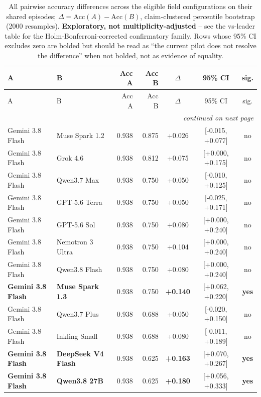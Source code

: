 \begin{longtable}{llrrccc}
\caption{All pairwise accuracy differences across the \FieldSize{} eligible field configurations on their \CommonEpisodes{} shared episodes; $\Delta = \mathrm{Acc}(A) - \mathrm{Acc}(B)$, claim-clustered percentile bootstrap (2000 resamples). \textbf{Exploratory, not multiplicity-adjusted} -- see the vs-leader table for the Holm-Bonferroni-corrected confirmatory family. Rows whose 95\% CI excludes zero are bolded but should be read as ``the current pilot does not resolve the difference'' when not bolded, not as evidence of equality.}\label{tab:pairwise-full}\\
\toprule
A & B & Acc A & Acc B & $\Delta$ & 95\% CI & sig. \\
\midrule
\endfirsthead
\toprule
A & B & Acc A & Acc B & $\Delta$ & 95\% CI & sig. \\
\midrule
\endhead
\midrule
\multicolumn{7}{r}{\emph{continued on next page}} \\
\endfoot
\bottomrule
\endlastfoot
Gemini 3.8 Flash & Muse Spark 1.2 & 0.938 & 0.875 & +0.026 & [-0.015, +0.077] & no \\
Gemini 3.8 Flash & Grok 4.6 & 0.938 & 0.812 & +0.075 & [+0.000, +0.175] & no \\
Gemini 3.8 Flash & Qwen3.7 Max & 0.938 & 0.750 & +0.050 & [-0.010, +0.125] & no \\
Gemini 3.8 Flash & GPT-5.6 Terra & 0.938 & 0.750 & +0.050 & [-0.025, +0.171] & no \\
Gemini 3.8 Flash & GPT-5.6 Sol & 0.938 & 0.750 & +0.080 & [+0.000, +0.240] & no \\
Gemini 3.8 Flash & Nemotron 3 Ultra & 0.938 & 0.750 & +0.104 & [+0.000, +0.240] & no \\
Gemini 3.8 Flash & Qwen3.8 Flash & 0.938 & 0.750 & +0.080 & [+0.000, +0.240] & no \\
\textbf{Gemini 3.8 Flash} & \textbf{Muse Spark 1.3} & 0.938 & 0.750 & \textbf{+0.140} & [+0.062, +0.220] & \textbf{yes} \\
Gemini 3.8 Flash & Qwen3.7 Plus & 0.938 & 0.688 & +0.050 & [-0.020, +0.150] & no \\
Gemini 3.8 Flash & Inkling Small & 0.938 & 0.688 & +0.080 & [-0.011, +0.189] & no \\
\textbf{Gemini 3.8 Flash} & \textbf{DeepSeek V4 Flash} & 0.938 & 0.625 & \textbf{+0.163} & [+0.070, +0.267] & \textbf{yes} \\
\textbf{Gemini 3.8 Flash} & \textbf{Qwen3.8 27B} & 0.938 & 0.625 & \textbf{+0.180} & [+0.056, +0.333] & \textbf{yes} \\

\end{longtable}
